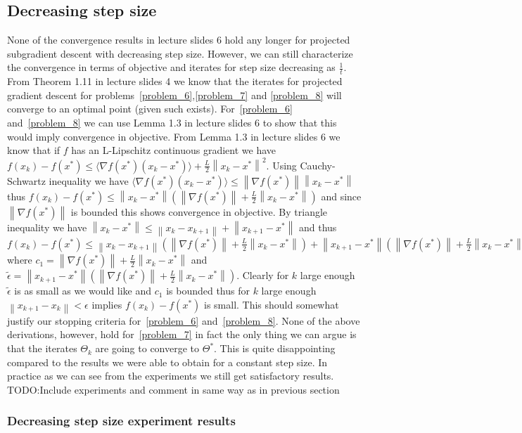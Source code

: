 \documentclass{article}
\newcommand{\0}{\mathrm{0}}
\newcommand{\1}{\mathrm{1}}
\newcommand{\norm}[1]{\left\| #1 \right\|}
\begin{document}
\subsection{Decreasing step size}
None of the convergence results in lecture slides 6 hold any longer for projected subgradient descent with decreasing step size. However, we can still characterize the convergence in terms of objective and iterates for step size decreasing as $\frac{1}{t}$. From Theorem 1.11 in lecture slides 4 we know that the iterates for projected gradient descent for problems~\ref{problem_6},\ref{problem_7} and \ref{problem_8} will converge to an optimal point (given such exists). For~\ref{problem_6} and~\ref{problem_8} we can use Lemma 1.3 in lecture slides 6 to show that this would imply convergence in objective. From Lemma 1.3 in lecture slides 6 we know that if $f$ has an L-Lipschitz continuous gradient we have $f(x_k) - f(x^*) \leq \langle\nabla f(x^*)(x_k-x^*)\rangle + \frac{L}{2}\norm{x_k-x^*}^2$. Using Cauchy-Schwartz inequality we have $\langle\nabla f(x^*)(x_k-x^*)\rangle \leq \norm{\nabla f(x^*)}\norm{x_k-x^*}$ thus $f(x_k) - f(x^*) \leq \norm{x_k-x^*}\left(\norm{\nabla f(x^*)} + \frac{L}{2}\norm{x_k-x^*}\right)$ and since $\norm{\nabla f(x^*)}$ is bounded this shows convergence in objective. By triangle inequality we have $\norm{x_k-x^*} \leq \norm{x_k-x_{k+1}} + \norm{x_{k+1} - x^*}$ and thus $f(x_k) - f(x^*) \leq \norm{x_k-x_{k+1}}(\norm{\nabla f(x^*)} + \frac{L}{2}\norm{x_k-x^*}) + \norm{x_{k+1}-x^*}\left(\norm{\nabla f(x^*)} + \frac{L}{2}\norm{x_k-x^*}\right) \leq \norm{x_k-x_{k+1}}c_1 + \tilde{\epsilon}$ where $c_1 = \norm{\nabla f(x^*)}  + \frac{L}{2}\norm{x_k-x^*}$ and $\tilde{\epsilon} = \norm{x_{k+1}-x^*}\left(\norm{\nabla f(x^*)} + \frac{L}{2}\norm{x_k-x^*}\right)$. Clearly for $k$ large enough $\tilde{\epsilon}$ is as small as we would like and $c_1$ is bounded thus for $k$ large enough $\norm{x_{k+1} - x_k} < \epsilon$ implies $f(x_k) - f(x^*)$ is small. This should somewhat justify our stopping criteria for~\ref{problem_6} and~\ref{problem_8}. None of the above derivations, however, hold for~\ref{problem_7} in fact the only thing we can argue is that the iterates $\Theta_k$ are going to converge to $\Theta^*$. This is quite disappointing compared to the results we were able to obtain for a constant step size. In practice as we can see from the experiments we still get satisfactory results.
TODO:Include experiments and comment in same way as in previous section

\subsubsection{Decreasing step size experiment results}
\end{document}

